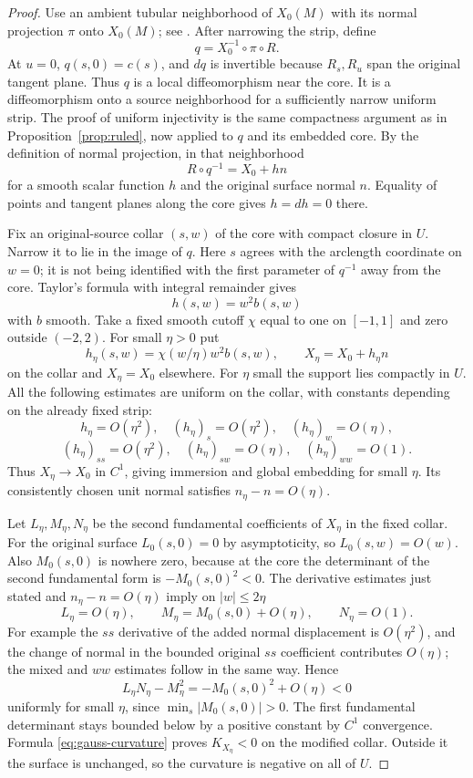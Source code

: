 \documentclass[11pt]{amsart}
\theoremstyle{definition}
\begin{document}
\begin{proof}
Use an ambient tubular neighborhood of $X_0(M)$ with its normal
projection $\pi$ onto $X_0(M)$; see
\cite[Theorem~6.24]{Lee}. After narrowing the strip, define
\[
 q=X_0^{-1}\circ\pi\circ R .
\]
At $u=0$, $q(s,0)=c(s)$, and $dq$ is invertible because
$R_s,R_u$ span the original tangent plane.
Thus $q$ is a local diffeomorphism near the core. It is a
diffeomorphism onto a source neighborhood for a sufficiently
narrow uniform strip. The proof of uniform injectivity is the same
compactness argument as in Proposition~\ref{prop:ruled}, now
applied to $q$ and its embedded core.
By the definition of normal projection, in that neighborhood
\[
 R\circ q^{-1}=X_0+hn
\]
for a smooth scalar function $h$ and the original surface normal
$n$. Equality of points and tangent planes along the core gives
$h=dh=0$ there.

Fix an original-source collar $(s,w)$ of the core with compact
closure in $U$. Narrow it to lie in the image of $q$. Here $s$
agrees with the arclength coordinate on $w=0$; it is not being
identified with the first parameter of $q^{-1}$ away from the core.
Taylor's formula with integral remainder gives
\[
 h(s,w)=w^2b(s,w)
\]
with $b$ smooth. Take a fixed smooth cutoff $\chi$ equal to one
on $[-1,1]$ and zero outside $(-2,2)$. For small $\eta>0$ put
\[
 h_\eta(s,w)=\chi(w/\eta)w^2b(s,w),\qquad
 X_\eta=X_0+h_\eta n
\]
on the collar and $X_\eta=X_0$ elsewhere.
For $\eta$ small the support lies compactly in $U$.
All the following estimates are uniform on the collar, with constants
depending on the already fixed strip:
\[
 h_\eta=O(\eta^2),\quad
 (h_\eta)_s=O(\eta^2),\quad(h_\eta)_w=O(\eta),
\]
\[
 (h_\eta)_{ss}=O(\eta^2),\quad
 (h_\eta)_{sw}=O(\eta),\quad(h_\eta)_{ww}=O(1).
\]
Thus $X_\eta\to X_0$ in $C^1$, giving immersion and global
embedding for small $\eta$. Its consistently chosen unit normal
satisfies $n_\eta-n=O(\eta)$.

Let $L_\eta,M_\eta,N_\eta$ be the second fundamental coefficients
of $X_\eta$ in the fixed collar. For the original surface
$L_0(s,0)=0$ by asymptoticity, so $L_0(s,w)=O(w)$.
Also $M_0(s,0)$ is nowhere zero, because at the core the
determinant of the second fundamental form is
$-M_0(s,0)^2<0$. The derivative estimates just stated and
$n_\eta-n=O(\eta)$ imply on $|w|\le2\eta$
\[
 L_\eta=O(\eta),\qquad
 M_\eta=M_0(s,0)+O(\eta),\qquad N_\eta=O(1).
\]
For example the $ss$ derivative of the added normal displacement
is $O(\eta^2)$, and the change of normal in the bounded original
$ss$ coefficient contributes $O(\eta)$; the mixed and $ww$
estimates follow in the same way. Hence
\[
 L_\eta N_\eta-M_\eta^2
     =-M_0(s,0)^2+O(\eta)<0
\]
uniformly for small $\eta$, since $\min_s|M_0(s,0)|>0$.
The first fundamental determinant stays bounded below by a
positive constant by $C^1$ convergence. Formula
\eqref{eq:gauss-curvature} proves $K_{X_\eta}<0$ on the
modified collar. Outside it the surface is unchanged, so the
curvature is negative on all of $U$.


\end{proof}
\end{document}
